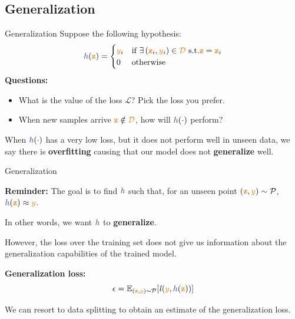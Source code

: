 \documentclass[aspectratio=169,10pt]{beamer}
\begin{document}
\subsection{Generalization}
\begin{frame}{Generalization}
	Suppose the following hypothesis:
	\begin{equation*}
		\hypothesis(\boldx) = \begin{cases} \smally_i & \text{if} \,\, \exists \, (\boldx_{i},\smally_{i}) \in \trainset \,\,\text{s.t.} \boldx = \boldx_{i} \\
			0 & \text{otherwise} \\
		\end{cases}
	\end{equation*}
	\pause
	\alert{\textbf{Questions:}}
	\begin{itemize}
		\item What is the value of the loss $\mathcal{L}$? Pick the loss you prefer.
		\pause
		\item When new samples arrive $\boldx \notin \trainset$, how will $\hypothesis(\cdot)$ perform?
	\end{itemize}
	\vspace{0.4cm}
	When $\hypothesis(\cdot)$ has a very low loss, but it does not perform well in unseen data, we say there is \textbf{overfitting} causing that our model does not \textbf{generalize} well.
\end{frame}

\begin{frame}{Generalization}
	
	\alert{\textbf{Reminder:}} The goal is to find $\hypothesis$ such that, for an unseen point $(\boldx,\smally) \sim \mathcal{P}$, $\hypothesis(\boldx) \approx \smally$. 
	
	In other words, we want $\hypothesis$ to \textbf{generalize}. 
	 
	\pause
	However, the loss over the training set does not give us information about the generalization capabilities of the trained model.
	
	\pause
	\alert{\textbf{Generalization loss:}}
	\begin{equation*}
		\epsilon = \mathbb{E}_{(\boldx,\smally)\sim \mathcal{P}}[\mathit{l}(\smally,\hypothesis(\boldx))]
	\end{equation*}

	We can resort to data splitting to obtain an estimate of the generalization loss.
	
\end{frame}
\end{document}

